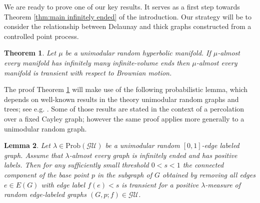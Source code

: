 \documentclass{amsart}
\newcommand{\GraphsU}{\mathcal{GU}}
\newcommand{\Hypers}{\mathcal{H}}
\theoremstyle{plain}
\newtheorem{theorem}{Theorem}[section]
\newtheorem{lemma}[theorem]{Lemma}
\numberwithin{equation}{section}
\theoremstyle{definition}
\begin{document}


We are ready to prove one of our key  results. It serves as a first step towards  Theorem \ref{thm:main infinitely ended} of the introduction. Our strategy will be to consider the relationship between  Delaunay and  thick graphs constructed from a controlled point process.

\begin{theorem}
\label{thm:infinitely ended unimodular random surfaces are transient}
Let $\mu$ be a unimodular random hyperbolic manifold. If $\mu$-almost every manifold has infinitely many infinite-volume ends then $\mu$-almost every manifold is transient with respect to Brownian motion.
\end{theorem}

The proof Theorem \ref{thm:infinitely ended unimodular random surfaces are transient} will make use of the following probabilistic lemma, which depends on well-known results in the theory  unimodular random graphs and trees; see e.g. \cite{aldous2007processes,lyons2017probability}. Some of those results are stated in the context of a percolation over a fixed Cayley graph; however the same proof applies more generally to a unimodular random graph.


\begin{lemma}
\label{lemma:finding trees}
Let $\lambda \in \mathrm{Prob}(\GraphsU) $ be a unimodular random $\left[0,1\right]$-edge labeled graph. Assume that $\lambda$-almost every graph is infinitely ended and has positive labels. Then for any sufficiently small threshold $0 < s < 1$ the connected component of the base point $p$ in the subgraph of $G$ obtained by removing all edges $e \in E(G)$ with edge label $f(e) < s$ is transient for a positive $\lambda$-measure of random edge-labeled graphs $(G,p;f) \in \GraphsU$.
\end{lemma}
\end{document}
